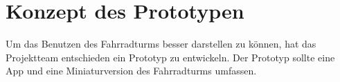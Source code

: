 \section{Konzept des Prototypen}

Um das Benutzen des Fahrradturms besser darstellen zu können, hat das Projektteam entschieden ein Prototyp zu entwickeln. Der Prototyp sollte eine App und eine Miniaturversion des Fahrradturms umfassen.



